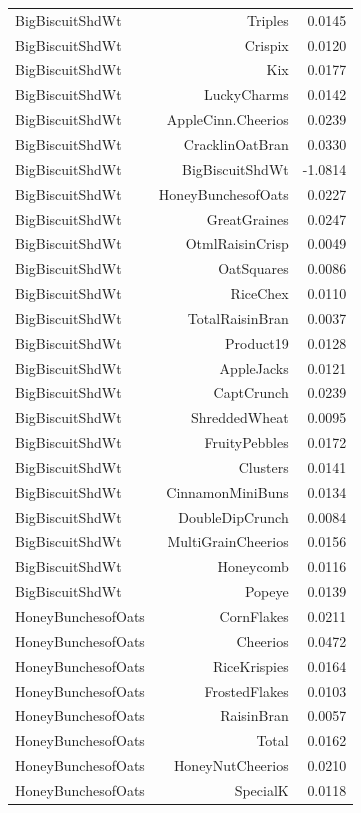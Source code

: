 \begin{longtable}{@{}lrr@{}}
BigBiscuitShdWt & Triples & 0.0145 \\
BigBiscuitShdWt & Crispix & 0.0120 \\
BigBiscuitShdWt & Kix & 0.0177 \\
BigBiscuitShdWt & LuckyCharms & 0.0142 \\
BigBiscuitShdWt & AppleCinn.Cheerios & 0.0239 \\
BigBiscuitShdWt & CracklinOatBran & 0.0330 \\
BigBiscuitShdWt & BigBiscuitShdWt & -1.0814 \\
BigBiscuitShdWt & HoneyBunchesofOats & 0.0227 \\
BigBiscuitShdWt & GreatGraines & 0.0247 \\
BigBiscuitShdWt & OtmlRaisinCrisp & 0.0049 \\
BigBiscuitShdWt & OatSquares & 0.0086 \\
BigBiscuitShdWt & RiceChex & 0.0110 \\
BigBiscuitShdWt & TotalRaisinBran & 0.0037 \\
BigBiscuitShdWt & Product19 & 0.0128 \\
BigBiscuitShdWt & AppleJacks & 0.0121 \\
BigBiscuitShdWt & CaptCrunch & 0.0239 \\
BigBiscuitShdWt & ShreddedWheat & 0.0095 \\
BigBiscuitShdWt & FruityPebbles & 0.0172 \\
BigBiscuitShdWt & Clusters & 0.0141 \\
BigBiscuitShdWt & CinnamonMiniBuns & 0.0134 \\
BigBiscuitShdWt & DoubleDipCrunch & 0.0084 \\
BigBiscuitShdWt & MultiGrainCheerios & 0.0156 \\
BigBiscuitShdWt & Honeycomb & 0.0116 \\
BigBiscuitShdWt & Popeye & 0.0139 \\
HoneyBunchesofOats & CornFlakes & 0.0211 \\
HoneyBunchesofOats & Cheerios & 0.0472 \\
HoneyBunchesofOats & RiceKrispies & 0.0164 \\
HoneyBunchesofOats & FrostedFlakes & 0.0103 \\
HoneyBunchesofOats & RaisinBran & 0.0057 \\
HoneyBunchesofOats & Total & 0.0162 \\
HoneyBunchesofOats & HoneyNutCheerios & 0.0210 \\
HoneyBunchesofOats & SpecialK & 0.0118 \\

\end{longtable}
